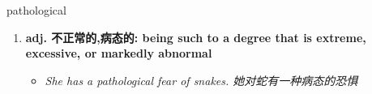 
\begin{frame}
{\huge pathological}
\begin{center}
\begin{enumerate}\Large
  \item \textbf{adj. 不正常的,病态的: being such to a degree that is extreme, excessive, or markedly abnormal}
  \begin{itemize}
    \item \em{\Large{She has a pathological fear of snakes. 她对蛇有一种病态的恐惧}}
  \end{itemize}
\end{enumerate}
\end{center}
\end{frame}
